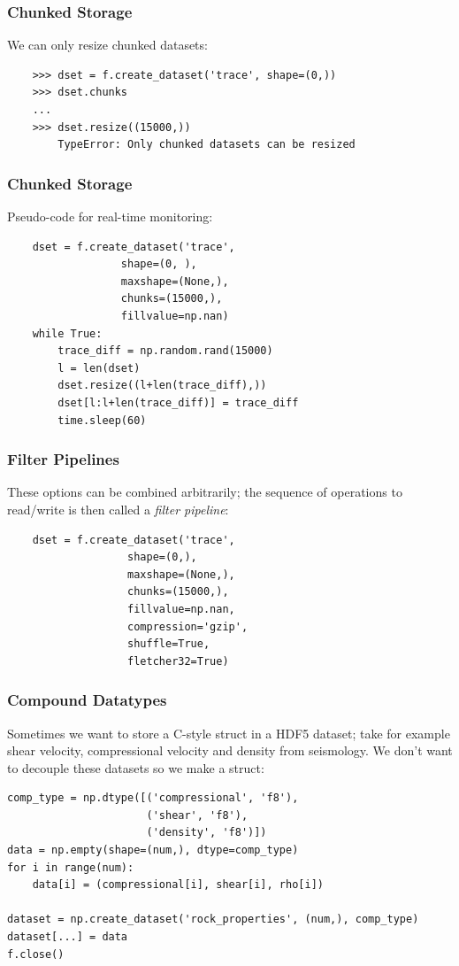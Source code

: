 \documentclass[9pt]{beamer}
\begin{document}
\begin{frame}[fragile]
  \frametitle{Chunked Storage}
  We can only resize chunked datasets:
  \begin{verbatim}
    >>> dset = f.create_dataset('trace', shape=(0,))
    >>> dset.chunks
    ...
    >>> dset.resize((15000,))
        TypeError: Only chunked datasets can be resized
  \end{verbatim}
\end{frame}

\begin{frame}[fragile]
  \frametitle{Chunked Storage}
  Pseudo-code for real-time monitoring:
  \begin{verbatim}
    dset = f.create_dataset('trace',
                  shape=(0, ),
                  maxshape=(None,),
                  chunks=(15000,),
                  fillvalue=np.nan)
    while True:
        trace_diff = np.random.rand(15000)
        l = len(dset)
        dset.resize((l+len(trace_diff),))
        dset[l:l+len(trace_diff)] = trace_diff
        time.sleep(60)
  \end{verbatim}
\end{frame}


\begin{frame}[fragile]
  \frametitle{Filter Pipelines}
  These options can be combined arbitrarily; the sequence of operations to read/write is then called a \emph{filter pipeline}:
  \begin{verbatim}
    dset = f.create_dataset('trace',
                   shape=(0,),
                   maxshape=(None,),
                   chunks=(15000,),
                   fillvalue=np.nan,
                   compression='gzip',
                   shuffle=True,
                   fletcher32=True)
  \end{verbatim}
\end{frame}

\begin{frame}[fragile]
\frametitle{Compound Datatypes}
Sometimes we want to store a C-style struct in a HDF5 dataset; take for example shear velocity, compressional velocity and density from seismology. We don't want to decouple these datasets so we make a struct:
\begin{verbatim}
comp_type = np.dtype([('compressional', 'f8'),
                      ('shear', 'f8'),
                      ('density', 'f8')])
data = np.empty(shape=(num,), dtype=comp_type)
for i in range(num):
    data[i] = (compressional[i], shear[i], rho[i])

dataset = np.create_dataset('rock_properties', (num,), comp_type)
dataset[...] = data
f.close()
\end{verbatim}
\end{frame}
\end{document}
